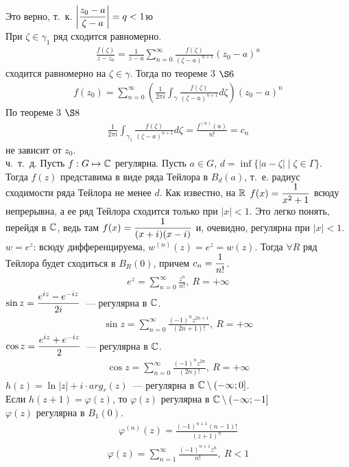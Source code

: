 Это верно, т.~к. $\left| \displaystyle \frac{z_0-a}{\zeta-a} \right| = q < 1$ю
\\
При $\zeta \in \gamma_1$ ряд сходится равномерно.
\begin{align*}
  \frac{f(\zeta)}{z - z_0} = \frac{1}{z - a} \sum_{n=0}^{\infty}\frac{f(\zeta)}{(\zeta - a)^{n+1}}\left( z_0-a\right)^n
\end{align*}
сходится равномерно на $\zeta \in \gamma$. Тогда по теореме $3$ $\S 6$
\begin{align*}
  f(z_0) = \sum_{n=0}^{\infty}\left( \frac{1}{2\pi i} \int_{\gamma} \frac{f(\zeta)}{(\zeta - a)^{n+1}} d \zeta \right)(z_0-a)^n
\end{align*}
По теореме $3$ $\S 8$
\begin{align*}
  \frac{1}{2 \pi i}\int_{\gamma_1}\frac{f(\zeta)}{(\zeta - a)^{n+1}}d \zeta = \frac{f^{(n)}(a)}{n!} = c_n
\end{align*}
не зависит от $z_0$.
\\
ч.~т.~д.
\corollary
Пусть $f: G \mapsto \mathbb{C}$ регулярна. Пусть $a \in G$, $d = \inf \{\left| a-\zeta
\right| \mid \zeta \in \Gamma\}$.
\\
Тогда $f(z)$ представима в виде ряда Тейлора в $B_d(a)$, т.~е. радиус сходимости
ряда Тейлора не менее $d$.
\note
Как известно, на $\mathbb{R}$ $f(x) = \displaystyle \frac{1}{x^2+1}$ всюду непрерывна, а ее ряд
Тейлора сходится только при $\left| x \right|< 1$. Это легко понять, перейдя в
$\mathbb{C}$, ведь там $f(x) = \displaystyle \frac{1}{(x+i)(x-i)}$ и, очевидно, регулярна при
$\left| x \right| < 1$.
\example
$w = e^z$: всюду дифференцируема, $w^{(n)}(z) = e^z = w(z)$. Тогда $\forall R$
ряд Тейлора будет сходиться в $B_R(0)$, причем $c_n = \displaystyle \frac{1}{n!}$.
\begin{align*}
  e^z = \sum_{n=0}^{\infty} \frac{z^n}{n!}, \ R = +\infty
\end{align*}
\example
$\sin z = \displaystyle \frac{e^{iz} - e^{-iz}}{2i}$~--- регулярна в $\mathbb{C}$.
\begin{align*}
  \sin z = \sum_{n=0}^{\infty} \frac{(-1)^nz^{2n+1}}{(2n+1)!}, \ R = +\infty
\end{align*}
\example
$\cos z = \displaystyle \frac{e^{iz} + e^{-iz}}{2}$~--- регулярна в $\mathbb{C}$.
\begin{align*}
  \cos z = \sum_{n=0}^{\infty} \frac{(-1)^nz^{2n}}{(2n)!}, \ R = +\infty
\end{align*}
\example
$h(z) = \ln \left| z \right| + i \cdot arg_r(z)$~--- регулярна в $\mathbb{C} \setminus
(-\infty; 0]$.
\\
Если $h(z+1) = \varphi(z)$, то $\varphi(z)$ регулярна в $\mathbb{C}\setminus (-\infty; -1]$
\\
$\varphi(z)$ регулярна в $B_1(0)$.
\begin{align*}
  \varphi^{(n)}(z) = \frac{(-1)^{n+1}(n-1)!}{(z+1)^n}
\end{align*}
\begin{align*}
  \varphi(z) = \sum_{n=1}^{\infty}\frac{(-1)^{n+1}z^n}{n!}, \ R < 1
\end{align*}
